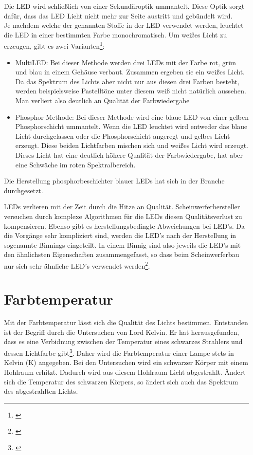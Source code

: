 Die LED wird schließlich von einer Sekundäroptik ummantelt. Diese Optik sorgt dafür, dass das LED Licht nicht mehr zur Seite austritt und gebündelt wird.\\
Je nachdem welche der genannten Stoffe in der LED verwendet werden, leuchtet die LED in einer bestimmten Farbe monochromatisch. Um weißes Licht zu erzeugen, gibt es zwei Varianten\footnote{\cite[151-152]{mueller}}:

\begin{itemize}
\item MultiLED: Bei dieser Methode werden drei LEDs mit der Farbe rot, grün und blau in einem Gehäuse verbaut. Zusammen ergeben sie ein weißes Licht. Da das Spektrum des Lichts aber nicht nur aus diesen drei Farben besteht, werden beispielsweise Pastelltöne unter diesem weiß nicht natürlich aussehen. Man verliert also deutlich an Qualität der Farbwiedergabe

\item Phosphor Methode: Bei dieser Methode wird eine blaue LED von einer gelben Phosphorschicht ummantelt. Wenn die LED leuchtet wird entweder das blaue Licht durchgelassen oder die Phosphorschicht angeregt und gelbes Licht erzeugt. Diese beiden Lichtfarben mischen sich und weißes Licht wird erzeugt. Dieses Licht hat eine deutlich höhere Qualität der Farbwiedergabe, hat aber eine Schwäche im roten Spektralbereich. 
\end{itemize}

Die Herstellung phosphorbeschichter blauer LEDs hat sich in der Branche durchgesetzt.

LEDs verlieren mit der Zeit durch die Hitze an Qualität. Scheinwerferhersteller versuchen durch komplexe Algorithmen für die LEDs diesen Qualitätsverlust zu kompensieren. Ebenso gibt es herstellungsbedingte Abweichungen bei LED's. Da die Vorgänge sehr kompliziert sind, werden die LED's nach der Herstellung in sogenannte Binnings eingeteilt. In einem Binnig sind also jeweils die LED's mit den ähnlichsten Eigenschaften zusammengefasst, so dass beim Scheinwerferbau nur sich sehr ähnliche LED's verwendet werden\footnote{\cite[153]{mueller}}.


\section{Farbtemperatur} \label{sec_farbtemperatur}
Mit der Farbtemperatur lässt sich die Qualität des Lichts 
bestimmen. Entstanden ist der Begriff durch die Untersuchen von Lord Kelvin. Er hat herausgefunden, dass es eine Verbidnung zwischen der Temperatur eines schwarzes Strahlers und dessen Lichtfarbe gibt\footnote{\cite[89]{mueller}}. Daher wird die Farbtemperatur einer Lampe stets in Kelvin (K) angegeben. Bei den Untersuchen wird ein schwarzer Körper mit einem Hohlraum erhitzt. Dadurch wird aus diesem Hohlraum Licht abgestrahlt. Ändert sich die Temperatur des schwarzen Körpers, so ändert sich auch das Spektrum des abgestrahlten Lichts.

